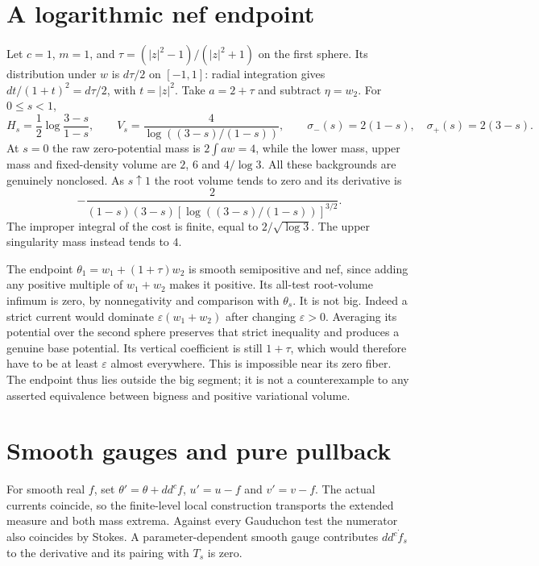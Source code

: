 \documentclass[11pt]{article}
\newcommand{\ddc}{dd^c}
\begin{document}
\section{A logarithmic nef endpoint}
Let $c=1$, $m=1$, and
$\tau=(|z|^2-1)/(|z|^2+1)$ on the first sphere. Its distribution under
$w$ is $d\tau/2$ on $[-1,1]$: radial integration gives
$dt/(1+t)^2=d\tau/2$, with $t=|z|^2$. Take $a=2+\tau$ and subtract
$\eta=w_2$. For $0\leq s<1$,
\[
 H_s=\frac12\log\frac{3-s}{1-s},\qquad
 V_s=\frac4{\log((3-s)/(1-s))},\qquad
 \sigma_-(s)=2(1-s),\quad\sigma_+(s)=2(3-s).
\]
At $s=0$ the raw zero-potential mass is $2\int a w=4$, while the lower
mass, upper mass and fixed-density volume are $2$, $6$ and $4/\log3$.
All these backgrounds are genuinely nonclosed. As $s\uparrow1$ the root
volume tends to zero and its derivative is
\[
 -\frac{2}{(1-s)(3-s)[\log((3-s)/(1-s))]^{3/2}}.
\]
The improper integral of the cost is finite, equal to $2/\sqrt{\log3}$.
The upper singularity mass instead tends to $4$.

The endpoint $\theta_1=w_1+(1+\tau)w_2$ is smooth semipositive and nef,
since adding any positive multiple of $w_1+w_2$ makes it positive. Its
all-test root-volume infimum is zero, by nonnegativity and comparison with
$\theta_s$. It is not big. Indeed a strict current would dominate
$\varepsilon(w_1+w_2)$ after changing $\varepsilon>0$. Averaging its
potential over the second sphere preserves that strict inequality and
produces a genuine base potential. Its vertical coefficient is still
$1+\tau$, which would therefore have to be at least $\varepsilon$
almost everywhere. This is impossible near its zero fiber.
The endpoint thus lies outside the big segment; it is not a counterexample
to any asserted equivalence between bigness and positive variational volume.

\section{Smooth gauges and pure pullback}
For smooth real $f$, set $\theta'=\theta+\ddc f$, $u'=u-f$ and $v'=v-f$.
The actual currents coincide, so the finite-level local construction
transports the extended measure and both mass extrema. Against every
Gauduchon test the numerator also coincides by Stokes. A parameter-dependent
smooth gauge contributes $\ddc\dot f_s$ to the derivative and its pairing
with $T_s$ is zero.
\end{document}
